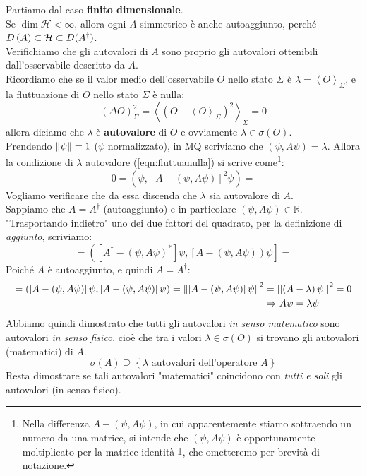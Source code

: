 Partiamo dal caso \textbf{finito dimensionale}.\\
Se $\dim{\mathcal{H}<\infty}$, allora ogni $A$ simmetrico è anche autoaggiunto, perché $D\left(A\right)\subset \mathcal{H} \subset D(A^\dag)$.\\
Verifichiamo che gli autovalori di $A$ sono proprio gli autovalori ottenibili dall'osservabile descritto da $A$.\\
Ricordiamo che se il valor medio dell'osservabile $O$ nello stato $\Sigma$ è $\lambda=\left\langle O\right\rangle_\Sigma$, e la fluttuazione di $O$ nello stato $\Sigma$ è nulla:
\begin{equation}
\left(\Delta O\right)_\Sigma^2=\left\langle\left(O-\left\langle O\right\rangle_\Sigma\right)^2\right\rangle_\Sigma=0
\label{eqn:fluttuanulla}
\end{equation}
allora diciamo che $\lambda$ è \textbf{autovalore} di $O$ e ovviamente  $\lambda \in \sigma \left(O\right)$.\\
Prendendo $\left\lVert\psi\right\rVert=1$ ($\psi$ normalizzato), in MQ scriviamo che $(\psi,A\psi) = \lambda$. Allora la condizione di $\lambda$ autovalore (\ref{eqn:fluttuanulla}) si scrive come\footnote{Nella differenza $A-(\psi,A\psi)$, in cui apparentemente stiamo sottraendo un numero da una matrice, si intende che $(\psi,A\psi)$ è opportunamente moltiplicato per la matrice identità $\mathbb{I}$, che ometteremo per brevità di notazione.}:
\[
0=\left(\psi, \left[A-\left(\psi,A\psi\right)\right]^2\psi\right) =
\]
Vogliamo verificare che da essa discenda che $\lambda$ sia autovalore di $A$.\\
Sappiamo che $A=A^\dag$ (autoaggiunto) e in particolare $\left(\psi,A\psi\right)\in\mathbb{R}$.\\
"Trasportando indietro" uno dei due fattori del quadrato, per la definizione di \textit{aggiunto}, scriviamo:
\[
=\left(\left[A^\dag-\left(\psi,A\psi\right)^*\right]\psi, \left[A-\left(\psi,A\psi\right)\right)\psi\right]=
\]
Poiché $A$ è autoaggiunto, e quindi $A=A^\dag$:
\begin{align}
\nonumber =\left(\left[A-\left(\psi,A\psi\right)\right]\psi,\left[A-\left(\psi,A\psi\right)\right]\psi\right)=\left\lVert\left[A-\left(\psi,A\psi\right)\right]\psi\right\rVert^2&=\left|\left|\left(A-\lambda\right)\psi\right|\right|^2 = 0\\
\label{eqn:fluttuazione-autoaggiunto}
 &\Rightarrow A\psi=\lambda\psi
\end{align}
Abbiamo quindi dimostrato che tutti gli autovalori \textit{in senso matematico} sono autovalori \textit{in senso fisico}, cioè che tra i valori $\lambda \in \sigma \left(O\right)$ si trovano gli autovalori (matematici) di $A$.
\[
\sigma\left(A\right)\supseteq\left\{\lambda\text{ autovalori dell'operatore } A\right\}
\]
Resta dimostrare se tali autovalori "matematici" coincidono con \textit{tutti e soli} gli autovalori (in senso fisico).\\

